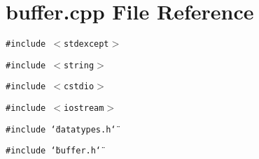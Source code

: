 \section{buffer.cpp File Reference}
\label{buffer_8cpp}
{\tt \#include $<$stdexcept$>$}\par
{\tt \#include $<$string$>$}\par
{\tt \#include $<$cstdio$>$}\par
{\tt \#include $<$iostream$>$}\par
{\tt \#include \char`\"{}datatypes.h\char`\"{}}\par
{\tt \#include \char`\"{}buffer.h\char`\"{}}\par
